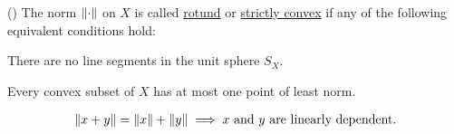 \begin{definition}\label{def:rotund_norm}(\cite[Definition 2.36]{Phelps1993})
  The norm $\left\Vert \cdot \right\Vert$ on $X$ is called \uline{rotund} or \uline{strictly convex} if any of the following equivalent conditions hold:
  \begin{defenum}
    \item\label{def:rotund_norm/no_sphere_segments} There are no line segments in the unit sphere $S_X$.
    \item\label{def:rotund_norm/least_norm} Every convex subset of $X$ has at most one point of least norm.
    \item\label{def:rotund_norm/linearly_dependent}
    \begin{align}\label{def:rotund_norm/linearly_dependent/equation}
      \left\Vert x + y \right\Vert = \left\Vert x \right\Vert + \left\Vert y \right\Vert \implies x \text{ and } y \text{ are linearly dependent}.
    \end{align}
  \end{defenum}
\end{definition}
